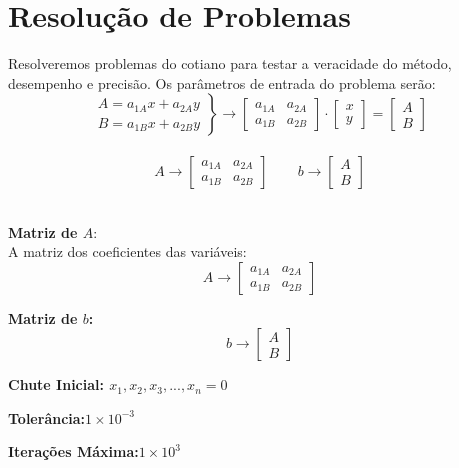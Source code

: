 \documentclass[
12pt,				%
openright,			%
twoside,			%
a4paper,			%
english,			%
french,				%
spanish,			%
brazil				%
]{abntex2_new}
\begin{document}
		\chapter{Resolução de Problemas}
		Resolveremos problemas do cotiano para testar a veracidade do método, desempenho
		e
		precisão. Os parâmetros de entrada do problema serão:\\
		$$\left.\begin{aligned}
		A=a_{1A} x + a_{2A} y\\
		B=a_{1B} x + a_{2B} y
		\end{aligned}
		\right\} \rightarrow
		\begin{bmatrix}
		a_{1A} & a_{2A} \\
		a_{1B} & a_{2B}
		\end{bmatrix} \cdot
		\begin{bmatrix}
		x \\
		y
		\end{bmatrix}
		= 
		\begin{bmatrix}
		A \\
		B
		\end{bmatrix}
		$$\\
		$$	A \rightarrow   \begin{bmatrix}
		a_{1A} & a_{2A} \\
		a_{1B} & a_{2B}
		\end{bmatrix} \hspace{25pt}
		b \rightarrow  \begin{bmatrix}
		A \\
		B
		\end{bmatrix}
		$$\\
		
		\begin{alineas}
			\item{\textbf{Matriz de $A$}:\\
				A matriz dos coeficientes das variáveis:
				$$A \rightarrow   \begin{bmatrix}
				a_{1A} & a_{2A} \\
				a_{1B} & a_{2B}
				\end{bmatrix}$$}
			\item{\textbf{Matriz de $b$:}
				$$b \rightarrow  \begin{bmatrix}
				A \\
				B
				\end{bmatrix}$$
			}
			\item{\textbf{Chute Inicial: $x_1,x_2,x_3,...,x_n = 0$}\\
				
			}
			\item{\textbf{Tolerância:$1 \times 10^{-3}$}}
			\item{\textbf{Iterações Máxima:$1 \times 10^{3}$}}
		\end{alineas}
		
\end{document}
